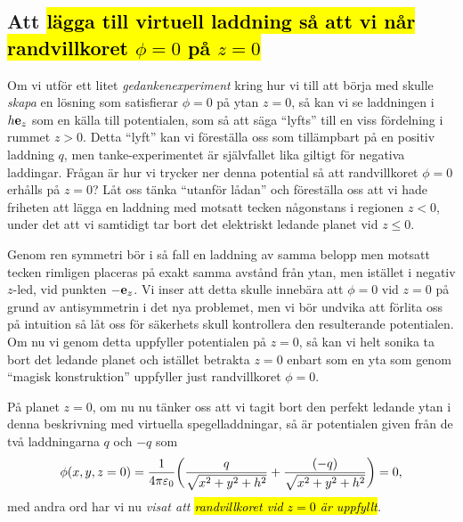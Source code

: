 {\subsection{Att {\hl{l{\"a}gga till virtuell laddning s{\aa} att vi n{\aa}r
  randvillkoret $\phi=0$ p{\aa} $z=0$}}}
Om vi utf{\"o}r ett litet {\it gedankenexperiment} kring hur vi till att
b{\"o}rja med skulle {\it skapa} en l{\"o}sning som satisfierar $\phi=0$ p{\aa}
ytan $z=0$, s{\aa} kan vi se laddningen i $h{\bf e}_z$ som en k{\"a}lla till
potentialen, som s{\aa} att s{\"a}ga ``lyfts'' till en viss f{\"o}rdelning i
rummet $z>0$. Detta ``lyft'' kan vi f{\"o}rest{\"a}lla oss som till{\"a}mpbart
p{\aa} en positiv laddning $q$, men tanke-experimentet {\"a}r sj{\"a}lvfallet
lika giltigt f{\"o}r negativa laddingar. Fr{\aa}gan {\"a}r hur vi trycker
ner denna potential s{\aa} att randvillkoret $\phi=0$ erh{\aa}lls p{\aa} $z=0$?
\noindent
L{\aa}t oss t{\"a}nka ``utanf{\"o}r l{\aa}dan'' och f{\"o}rest{\"a}lla oss att
vi hade friheten att l{\"a}gga en laddning med motsatt tecken n{\aa}gonstans i
regionen $z<0$, under det att vi samtidigt tar bort det elektriskt ledande
planet
vid $z\le0$.

Genom ren symmetri b{\"o}r i s{\aa} fall en laddning av samma belopp men motsatt
tecken rimligen placeras p{\aa} exakt samma avst{\aa}nd fr{\aa}n ytan, men
ist{\"a}llet i negativ $z$-led, vid punkten $-{\bf e}_z$.
Vi inser att detta skulle inneb{\"a}ra att $\phi=0$ vid $z=0$ p{\aa} grund av
antisymmetrin i det nya problemet, men vi b{\"o}r undvika att f{\"o}rlita oss
p{\aa} intuition s{\aa} l{\aa}t oss f{\"o}r s{\"a}kerhets skull kontrollera den
resulterande potentialen.
Om nu vi genom detta uppfyller potentialen p{\aa} $z=0$, s{\aa} kan vi helt
sonika ta bort det ledande planet och ist{\"a}llet betrakta $z=0$ enbart som
en yta som genom ``magisk konstruktion'' uppfyller just randvillkoret $\phi=0$.
\vfill\eject

P{\aa} planet $z=0$, om nu nu t{\"a}nker oss att vi tagit bort den perfekt
ledande ytan i denna beskrivning med virtuella spegelladdningar, s{\aa} {\"a}r
potentialen given fr{\aa}n de tv{\aa} laddningarna $q$ och $-q$
som
\hl{$$
  \phi(x,y,z=0)={{1}\over{4\pi\varepsilon_0}}\bigg(
    {{q}\over{\sqrt{x^2+y^2+h^2}}}+{{(-q)}\over{\sqrt{x^2+y^2+h^2}}}
  \bigg)=0,
$$}
med andra ord har vi nu {\it visat att {\hl{randvillkoret vid $z=0$ {\"a}r
uppfyllt}}.}

}
